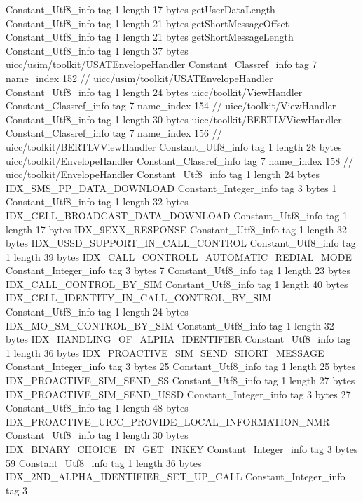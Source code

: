 {{{		}
		Constant_Utf8_info {
			tag	1
			length	17
			bytes	getUserDataLength
		}
		Constant_Utf8_info {
			tag	1
			length	21
			bytes	getShortMessageOffset
		}
		Constant_Utf8_info {
			tag	1
			length	21
			bytes	getShortMessageLength
		}
		Constant_Utf8_info {
			tag	1
			length	37
			bytes	uicc/usim/toolkit/USATEnvelopeHandler
		}
		Constant_Classref_info {
			tag	7
			name_index	152		// uicc/usim/toolkit/USATEnvelopeHandler
		}
		Constant_Utf8_info {
			tag	1
			length	24
			bytes	uicc/toolkit/ViewHandler
		}
		Constant_Classref_info {
			tag	7
			name_index	154		// uicc/toolkit/ViewHandler
		}
		Constant_Utf8_info {
			tag	1
			length	30
			bytes	uicc/toolkit/BERTLVViewHandler
		}
		Constant_Classref_info {
			tag	7
			name_index	156		// uicc/toolkit/BERTLVViewHandler
		}
		Constant_Utf8_info {
			tag	1
			length	28
			bytes	uicc/toolkit/EnvelopeHandler
		}
		Constant_Classref_info {
			tag	7
			name_index	158		// uicc/toolkit/EnvelopeHandler
		}
		Constant_Utf8_info {
			tag	1
			length	24
			bytes	IDX_SMS_PP_DATA_DOWNLOAD
		}
		Constant_Integer_info {
			tag	3
			bytes	1
		}
		Constant_Utf8_info {
			tag	1
			length	32
			bytes	IDX_CELL_BROADCAST_DATA_DOWNLOAD
		}
		Constant_Utf8_info {
			tag	1
			length	17
			bytes	IDX_9EXX_RESPONSE
		}
		Constant_Utf8_info {
			tag	1
			length	32
			bytes	IDX_USSD_SUPPORT_IN_CALL_CONTROL
		}
		Constant_Utf8_info {
			tag	1
			length	39
			bytes	IDX_CALL_CONTROLL_AUTOMATIC_REDIAL_MODE
		}
		Constant_Integer_info {
			tag	3
			bytes	7
		}
		Constant_Utf8_info {
			tag	1
			length	23
			bytes	IDX_CALL_CONTROL_BY_SIM
		}
		Constant_Utf8_info {
			tag	1
			length	40
			bytes	IDX_CELL_IDENTITY_IN_CALL_CONTROL_BY_SIM
		}
		Constant_Utf8_info {
			tag	1
			length	24
			bytes	IDX_MO_SM_CONTROL_BY_SIM
		}
		Constant_Utf8_info {
			tag	1
			length	32
			bytes	IDX_HANDLING_OF_ALPHA_IDENTIFIER
		}
		Constant_Utf8_info {
			tag	1
			length	36
			bytes	IDX_PROACTIVE_SIM_SEND_SHORT_MESSAGE
		}
		Constant_Integer_info {
			tag	3
			bytes	25
		}
		Constant_Utf8_info {
			tag	1
			length	25
			bytes	IDX_PROACTIVE_SIM_SEND_SS
		}
		Constant_Utf8_info {
			tag	1
			length	27
			bytes	IDX_PROACTIVE_SIM_SEND_USSD
		}
		Constant_Integer_info {
			tag	3
			bytes	27
		}
		Constant_Utf8_info {
			tag	1
			length	48
			bytes	IDX_PROACTIVE_UICC_PROVIDE_LOCAL_INFORMATION_NMR
		}
		Constant_Utf8_info {
			tag	1
			length	30
			bytes	IDX_BINARY_CHOICE_IN_GET_INKEY
		}
		Constant_Integer_info {
			tag	3
			bytes	59
		}
		Constant_Utf8_info {
			tag	1
			length	36
			bytes	IDX_2ND_ALPHA_IDENTIFIER_SET_UP_CALL
		}
		Constant_Integer_info {
			tag	3
}}}
